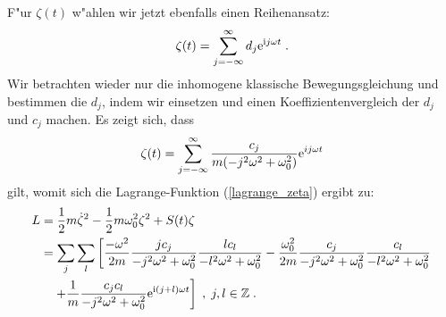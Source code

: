   F"ur $\zeta(t)$ w"ahlen wir jetzt ebenfalls einen Reihenansatz:
  \begin{equation}
    \zeta(t) = \sum_{j=-\infty}^\infty d_j \text e^{\text ij\omega t} \; .
  \end{equation}
  Wir betrachten wieder nur die inhomogene klassische Bewegungsgleichung und bestimmen die $d_j$, indem wir einsetzen und einen Koeffizientenvergleich der $d_j$ und $c_j$ machen.
  Es zeigt sich, dass
  \begin{equation}
    \zeta(t) = \sum_{j=-\infty}^\infty \frac{c_j}{m(-j^2\omega^2+\omega_0^2)} \text e^{ij\omega t}
  \end{equation}
  gilt, womit sich die Lagrange-Funktion (\ref{lagrange_zeta}) ergibt zu:
  \begin{align}
    \begin{split}
      L &= \frac{1}{2}m\dot \zeta^2 - \frac{1}{2}m\omega_0^2\zeta^2 + S(t)\zeta \\
       &=\sum_j \sum_l \left[ \frac{-\omega^2}{2m} \frac{jc_j}{-j^2\omega^2+\omega_0^2} \frac{lc_l}{-l^2\omega^2+\omega_0^2}
       -\frac{\omega_0^2}{2m} \frac{c_j}{-j^2\omega^2+\omega_0^2} \frac{c_l}{-l^2\omega^2+\omega_0^2} \right. \\
        &\left. \quad + \frac{1}{m} \frac{c_jc_l}{-j^2\omega^2+\omega_0^2} \text e^{\text i(j+l)\omega t} \right] \; , \; j,l \in \mathbb{Z} \; .
     \end{split}
   \end{align}
  \iffalse
  \begin{align}
    \begin{split}
      L &= \frac{1}{2}m\dot \zeta^2 - \frac{1}{2}m\omega_0^2\zeta^2 + S(t)\zeta \\
       &=\frac{-\omega^2}{2m} \sum_j \sum_l \frac{jc_j}{-j^2\omega^2+\omega_0^2} \frac{lc_l}{-l^2\omega^2+\omega_0^2} \text e^{\text i(j+l)\omega t}\\
       &\quad-\frac{\omega_0^2}{2m} \sum_j \sum_l \frac{c_j}{-j^2\omega^2+\omega_0^2} \frac{c_l}{-l^2\omega^2+\omega_0^2} \text e^{\text i(j+l)\omega t}\\
       &\quad + \frac{1}{m} \sum_j \sum_l \frac{c_jc_l}{-j^2\omega^2+\omega_0^2} \text e^{\text i(j+l)\omega t}\; , \; j,l \in \mathbb{Z} \; .
     \end{split}
   \end{align}
   \fi

